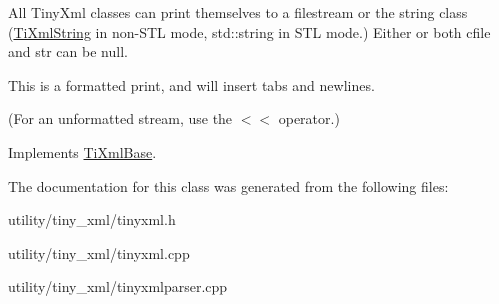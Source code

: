 All Tiny\+Xml classes can print themselves to a filestream or the string class (\hyperlink{class_ti_xml_string}{Ti\+Xml\+String} in non-\/\+S\+TL mode, std\+::string in S\+TL mode.) Either or both cfile and str can be null.

This is a formatted print, and will insert tabs and newlines.

(For an unformatted stream, use the $<$$<$ operator.) 

Implements \hyperlink{class_ti_xml_base_a0de56b3f2ef14c65091a3b916437b512}{Ti\+Xml\+Base}.



The documentation for this class was generated from the following files\+:\begin{DoxyCompactItemize}
\item 
utility/tiny\+\_\+xml/tinyxml.\+h\item 
utility/tiny\+\_\+xml/tinyxml.\+cpp\item 
utility/tiny\+\_\+xml/tinyxmlparser.\+cpp\end{DoxyCompactItemize}
